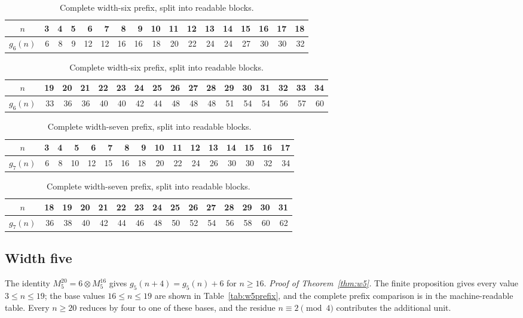 \documentclass[11pt]{article}
\theoremstyle{definition}
\begin{document}
\begin{table}[ht]
\centering
\caption{Complete width-six prefix, split into readable blocks.}
\scriptsize
\begin{tabular}{c|rrrrrrrrrrrrrrrr}
\toprule
\(n\)&3&4&5&6&7&8&9&10&11&12&13&14&15&16&17&18\\
\midrule
\(g_6(n)\)&6&8&9&12&12&16&16&18&20&22&24&24&27&30&30&32\\
\bottomrule
\end{tabular}

\vspace{2mm}
\begin{tabular}{c|rrrrrrrrrrrrrrrr}
\toprule
\(n\)&19&20&21&22&23&24&25&26&27&28&29&30&31&32&33&34\\
\midrule
\(g_6(n)\)&33&36&36&40&40&42&44&48&48&48&51&54&54&56&57&60\\
\bottomrule
\end{tabular}
\normalsize
\end{table}

\begin{table}[ht]
\centering
\caption{Complete width-seven prefix, split into readable blocks.}
\scriptsize
\begin{tabular}{c|rrrrrrrrrrrrrrr}
\toprule
\(n\)&3&4&5&6&7&8&9&10&11&12&13&14&15&16&17\\
\midrule
\(g_7(n)\)&6&8&10&12&15&16&18&20&22&24&26&30&30&32&34\\
\bottomrule
\end{tabular}

\vspace{2mm}
\begin{tabular}{c|rrrrrrrrrrrrrr}
\toprule
\(n\)&18&19&20&21&22&23&24&25&26&27&28&29&30&31\\
\midrule
\(g_7(n)\)&36&38&40&42&44&46&48&50&52&54&56&58&60&62\\
\bottomrule
\end{tabular}
\normalsize
\end{table}

\subsection{Width five}

The identity \(M_5^{20}=6\otimes M_5^{16}\) gives
\(g_5(n+4)=g_5(n)+6\) for \(n\geq16\). \textit{Proof of
Theorem~\ref{thm:w5}.} The finite proposition gives every value
\(3\le n\le19\); the base values \(16\le n\le19\) are shown in
Table~\ref{tab:w5prefix}, and the complete prefix comparison is in the
machine-readable table. Every \(n\ge20\) reduces by four to one of these
bases, and the residue \(n\equiv2\pmod4\) contributes the additional unit.
\end{document}
